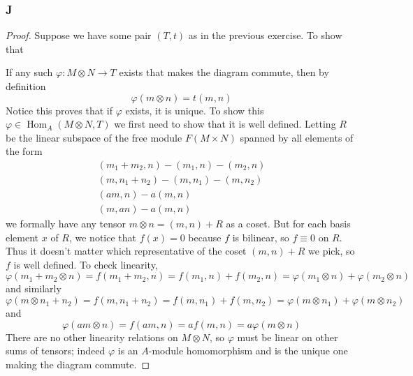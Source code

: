 \documentclass{article}
\DeclareMathOperator{\Hom}{\mathrm{Hom}}
\begin{document}
\subsubsection{J}\label{1.3.J}
\begin{proof}
    Suppose we have some pair $(T,t)$ as in the previous exercise. To show that
    \begin{center}
    \end{center}
    If any such $\varphi:M\otimes N\to T$ exists that makes the diagram commute, then by definition
    \[
    \varphi(m\otimes n)=t(m,n)
    \]
    Notice this proves that if $\varphi$ exists, it is unique. To show this $\varphi\in \Hom_A(M\otimes N,T)$ we first need to show that it is well defined. Letting $R$ be the linear subspace of the free module $F(M\times N)$ spanned by all elements of the form
    \begin{align*}
        (m_1+m_2,n)-(m_1,n)-(m_2,n)\\
        (m,n_1+n_2)-(m,n_1)-(m,n_2)\\
        (am,n)-a(m,n)\\
        (m,an)-a(m,n)
    \end{align*}
    we formally have any tensor $m\otimes n=(m,n)+R$ as a coset. But for each basis element $x$ of $R$, we notice that $f(x)=0$ because $f$ is bilinear, so $f\equiv 0$ on $R$. Thus it doesn't matter which representative of the coset $(m,n)+R$ we pick, so $f$ is well defined. 
    To check linearity,
    \[
    \varphi(m_1+m_2\otimes n)=f(m_1+m_2,n)=f(m_1,n)+f(m_2,n)=\varphi(m_1\otimes n)+\varphi(m_2\otimes n)
    \]
    and similarly
    \[
    \varphi(m\otimes n_1+n_2)=f(m,n_1+n_2)=f(m,n_1)+f(m,n_2)=\varphi(m\otimes n_1)+\varphi(m\otimes n_2)
    \]
    and
    \[
    \varphi(am\otimes n)=f(am,n)=af(m,n)=a\varphi(m\otimes n)
    \]
    There are no other linearity relations on $M\otimes N$, so $\varphi$ must be linear on other sums of tensors; indeed $\varphi$ is an $A$-module homomorphism and is the unique one making the diagram commute.
\end{proof}
\end{document}
